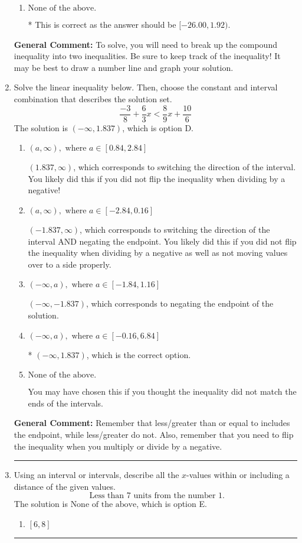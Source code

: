 \documentclass{extbook}[14pt]
\newcommand{\litem}[1]{\item #1

\rule{\textwidth}{0.4pt}}
\begin{document}
\begin{enumerate}
{\begin{enumerate}[label=\Alph*.]
$[26.00, -1.92)$, which is the correct interval but negatives of the actual endpoints.
\item \( \text{None of the above.} \)

* This is correct as the answer should be $[-26.00, 1.92)$.
\end{enumerate}

\textbf{General Comment:} To solve, you will need to break up the compound inequality into two inequalities. Be sure to keep track of the inequality! It may be best to draw a number line and graph your solution.
}
\litem{
Solve the linear inequality below. Then, choose the constant and interval combination that describes the solution set.
\[ \frac{-3}{8} + \frac{6}{3} x < \frac{8}{9} x + \frac{10}{6} \]The solution is \( (-\infty, 1.837) \), which is option D.\begin{enumerate}[label=\Alph*.]
\item \( (a, \infty), \text{ where } a \in [0.84, 2.84] \)

 $(1.837, \infty)$, which corresponds to switching the direction of the interval. You likely did this if you did not flip the inequality when dividing by a negative!
\item \( (a, \infty), \text{ where } a \in [-2.84, 0.16] \)

 $(-1.837, \infty)$, which corresponds to switching the direction of the interval AND negating the endpoint. You likely did this if you did not flip the inequality when dividing by a negative as well as not moving values over to a side properly.
\item \( (-\infty, a), \text{ where } a \in [-1.84, 1.16] \)

 $(-\infty, -1.837)$, which corresponds to negating the endpoint of the solution.
\item \( (-\infty, a), \text{ where } a \in [-0.16, 6.84] \)

* $(-\infty, 1.837)$, which is the correct option.
\item \( \text{None of the above}. \)

You may have chosen this if you thought the inequality did not match the ends of the intervals.
\end{enumerate}

\textbf{General Comment:} Remember that less/greater than or equal to includes the endpoint, while less/greater do not. Also, remember that you need to flip the inequality when you multiply or divide by a negative.
}
\litem{
Using an interval or intervals, describe all the $x$-values within or including a distance of the given values.
\[ \text{ Less than } 7 \text{ units from the number } 1. \]The solution is \( \text{None of the above} \), which is option E.\begin{enumerate}[label=\Alph*.]
\item \( [6, 8] \)


\end{enumerate}}
\end{enumerate}
\end{document}
